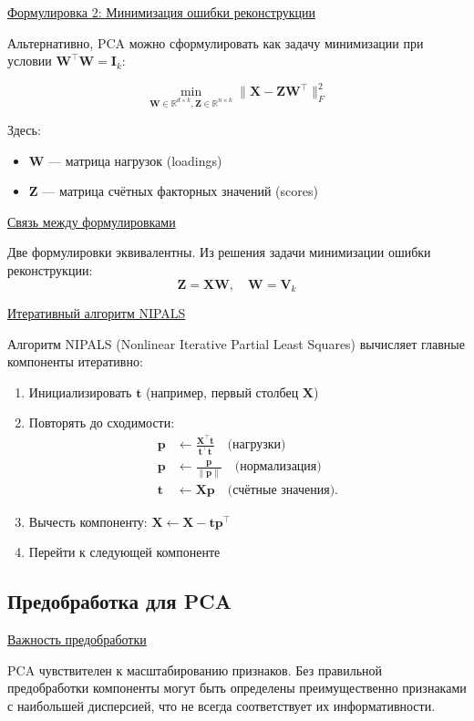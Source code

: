 \underline{Формулировка 2: Минимизация ошибки реконструкции}

Альтернативно, PCA можно сформулировать как задачу минимизации при условии $\bm{W}^\top\bm{W} = \bm{I}_k$:

\[ \min_{\bm{W} \in \mathbb{R}^{d \times k}, \bm{Z} \in \mathbb{R}^{n \times k}} \|\bm{X} - \bm{Z}\bm{W}^\top\|_F^2 \]

Здесь:
\begin{itemize}
    \item $\bm{W}$ --- матрица нагрузок (loadings)
    \item $\bm{Z}$ --- матрица счётных факторных значений (scores)
\end{itemize}

\underline{Связь между формулировками}

Две формулировки эквивалентны.
Из решения задачи минимизации ошибки реконструкции:
\[ \bm{Z} = \bm{X}\bm{W}, \quad \bm{W} = \bm{V}_k \]

\underline{Итеративный алгоритм NIPALS}

Алгоритм NIPALS (Nonlinear Iterative Partial Least Squares) вычисляет главные компоненты итеративно:

\begin{enumerate}
    \item Инициализировать $\bm{t}$ (например, первый столбец $\bm{X}$)
    \item Повторять до сходимости:
    \begin{align*}
        \bm{p} &\leftarrow \frac{\bm{X}^\top\bm{t}}{\bm{t}^\top\bm{t}} \quad \text{(нагрузки)} \\
        \bm{p} &\leftarrow \frac{\bm{p}}{\|\bm{p}\|} \quad \text{(нормализация)} \\
        \bm{t} &\leftarrow \bm{X}\bm{p} \quad \text{(счётные значения).}
    \end{align*}
    \item Вычесть компоненту: $\bm{X} \leftarrow \bm{X} - \bm{t}\bm{p}^\top$
    \item Перейти к следующей компоненте
\end{enumerate}

\subsection{Предобработка для PCA}

\underline{Важность предобработки}

PCA чувствителен к масштабированию признаков.
Без правильной предобработки компоненты могут быть определены преимущественно признаками с наибольшей дисперсией, что не
всегда соответствует их информативности.

